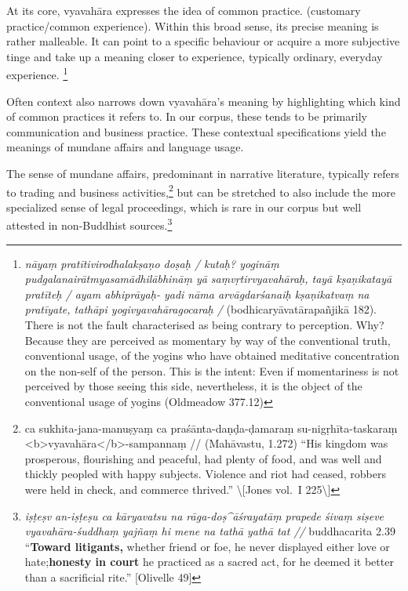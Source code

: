 \documentclass[
  letterpaper,
  DIV=11,
  numbers=noendperiod,
  oneside]{scrreprt}
\begin{document}
At its core, vyavahāra expresses the idea of common practice. (customary
practice/common experience). Within this broad sense, its precise
meaning is rather malleable. It can point to a specific behaviour or
acquire a more subjective tinge and take up a meaning closer to
experience, typically ordinary, everyday experience. \footnote{\emph{nāyaṃ
  pratītivirodhalakṣaṇo doṣaḥ / kutaḥ? yogināṃ
  pudgalanairātmyasamādhilābhināṃ yā saṃvṛtirvyavahāraḥ, tayā
  kṣaṇikatayā pratīteḥ / ayam abhiprāyaḥ- yadi nāma arvāgdarśanaiḥ
  kṣaṇikatvaṃ na pratīyate, tathāpi yogivyavahāragocaraḥ /}
  (bodhicaryāvatārapañjikā 182). There is not the fault characterised as
  being contrary to perception. Why? Because they are perceived as
  momentary by way of the conventional truth, conventional usage, of the
  yogins who have obtained meditative concentration on the non-self of
  the person. This is the intent: Even if momentariness is not perceived
  by those seeing this side, nevertheless, it is the object of the
  conventional usage of yogins (Oldmeadow 377.12)}

Often context also narrows down vyavahāra's meaning by highlighting
which kind of common practices it refers to. In our corpus, these tends
to be primarily communication and business practice. These contextual
specifications yield the meanings of mundane affairs and language usage.

The sense of mundane affairs, predominant in narrative literature,
typically refers to trading and business activities,\footnote{ca
  sukhita-jana-manuṣyaṃ ca praśānta-daṇḍa-ḍamaraṃ su-nigṛhīta-taskaraṃ
  \textless b\textgreater vyavahāra\textless/b\textgreater-sampannaṃ //
  (Mahāvastu, 1.272) ``His kingdom was prosperous, flourishing and
  peaceful, had plenty of food, and was well and thickly peopled with
  happy subjects. Violence and riot had ceased, robbers were held in
  check, and commerce thrived.'' \textbackslash{[}Jones vol.~I
  225\textbackslash{]}} but can be stretched to also include the more
specialized sense of legal proceedings, which is rare in our corpus but
well attested in non-Buddhist sources.\footnote{\emph{iṣṭeṣv an-iṣṭeṣu
  ca kāryavatsu na rāga-doṣ\^{}āśrayatāṃ prapede śivaṃ siṣeve
  vyavahāra-śuddhaṃ yajñaṃ hi mene na tathā yathā tat //} buddhacarita
  2.39 ``\textbf{Toward litigants,} whether friend or foe, he never
  displayed either love or hate;\textbf{honesty in court} he practiced
  as a sacred act, for he deemed it better than a sacrificial rite.''
  {[}Olivelle 49{]}}
\end{document}
